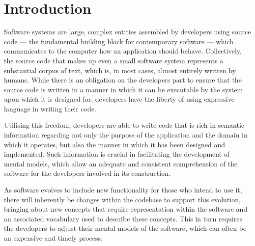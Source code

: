 \chapter{Introduction}
\label{chapter:Introduction} 





Software systems are large, complex entities assembled by developers using source code --- the fundamental building block for contemporary software --- which communicates to the computer how an application should behave. Collectively, the source code that makes up even a small software system represents a substantial corpus of text, which is, in most cases, almost entirely written by humans. While there is an obligation on the developers part to ensure that the source code is written in a manner in which it can be executable by the system upon which it is designed for, developers have the liberty of using expressive language in writing their code.

Utilising this freedom, developers are able to write code that is rich in semantic information regarding not only the purpose of the application and the domain in which it operates, but also the manner in which it has been designed and implemented. Such information is crucial in facilitating the development of mental models, which allow an adequate and consistent comprehension of the software for the developers involved in its construction.


As software evolves to include new functionality for those who intend to use it, there will inherently be changes within the codebase to support this evolution, bringing about new concepts that require representation within the software and an associated vocabulary used to describe these concepts. This in turn requires the developers to adjust their mental models of the software, which can often be an expensive and timely process.

